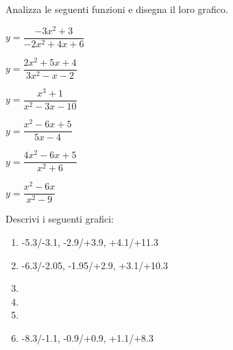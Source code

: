 \begin{esercizio}\label{ese:stufun.3e}
Analizza le seguenti funzioni e disegna il loro grafico.
\begin{multicols}{3}
 \begin{enumeratea}
  \item \(y = \dfrac{-3x^2 +3}{-2x^2 +4x +6}\) \\ %
  \item \(y = \dfrac{2x^2+5x+4}{3x^2-x-2}\) %
  \item \(y = \dfrac{x^3 +1}{x^2 -3x -10}\) \\ %
  \item \(y = \dfrac{x^2 - 6x + 5}{5x - 4}\) %
  \item \(y = \dfrac{4x^2 -6x +5}{x^2 +6}\) \\ %
  \item \(y = \dfrac{x^2 -6x}{x^2 -9}\) %
 \end{enumeratea}
\end{multicols}
\end{esercizio}

\bigskip

\begin{esercizio}\label{ese:stufun.4g}
Descrivi i seguenti grafici:
\begin{multicols}{2}
 \begin{enumerate} [left=0pt, label=\alph*)]
  \item \myp 
{} 
{-5.3/-3.1, -2.9/+3.9, +4.1/+11.3}%
  \item \myp 
{} 
{-6.3/-2.05, -1.95/+2.9, +3.1/+10.3}%
  \item \myp 
{}%
  \item \myp 
{} %
\item \myp 
{}%
\item \myp 
{}
{-8.3/-1.1, -0.9/+0.9, +1.1/+8.3}%
 \end{enumerate}
\end{multicols}
\end{esercizio}

